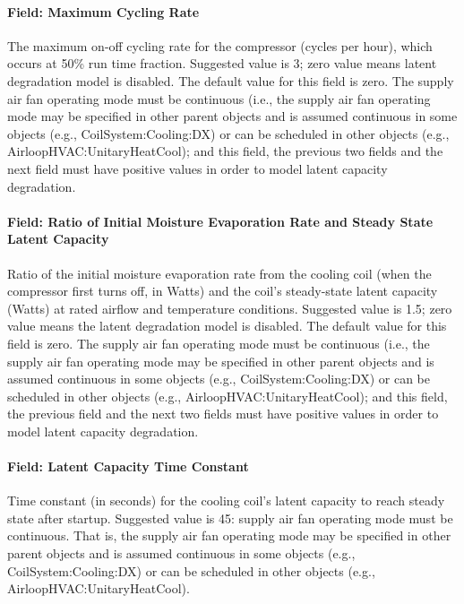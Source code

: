 \paragraph{Field: Maximum Cycling Rate}

The maximum on-off cycling rate for the compressor (cycles per hour), which occurs at 50\% run time fraction. Suggested value is 3; zero value means latent degradation model is disabled. The default value for this field is zero. The supply air fan operating mode must be continuous (i.e., the supply air fan operating mode may be specified in other parent objects and is assumed continuous in some objects (e.g., CoilSystem:Cooling:DX) or can be scheduled in other objects (e.g., AirloopHVAC:UnitaryHeatCool); and this field, the previous two fields and the next field must have positive values in order to model latent capacity degradation.

\paragraph{Field: Ratio of Initial Moisture Evaporation Rate and Steady State Latent Capacity}

Ratio of the initial moisture evaporation rate from the cooling coil (when the compressor first turns off, in Watts) and the coil's steady-state latent capacity (Watts) at rated airflow and temperature conditions. Suggested value is 1.5; zero value means the latent degradation model is disabled. The default value for this field is zero. The supply air fan operating mode must be continuous (i.e., the supply air fan operating mode may be specified in other parent objects and is assumed continuous in some objects (e.g., CoilSystem:Cooling:DX) or can be scheduled in other objects (e.g., AirloopHVAC:UnitaryHeatCool); and this field, the previous field and the next two fields must have positive values in order to model latent capacity degradation.

\paragraph{Field: Latent Capacity Time Constant}

Time constant (in seconds) for the cooling coil's latent capacity to reach steady state after startup. Suggested value is 45: supply air fan operating mode must be continuous. That is, the supply air fan operating mode may be specified in other parent objects and is assumed continuous in some objects (e.g., CoilSystem:Cooling:DX) or can be scheduled in other objects (e.g., AirloopHVAC:UnitaryHeatCool).

